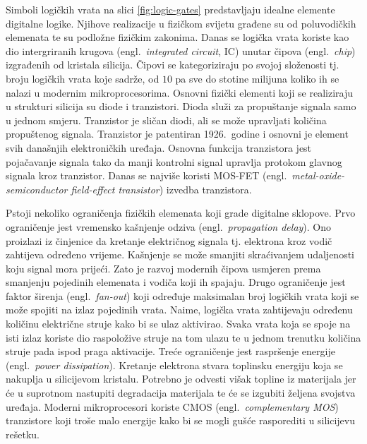 \documentclass[times, utf8, diplomski]{fer}
\begin{document}
Simboli logičkih vrata na slici \ref{fig:logic-gates} predstavljaju idealne elemente digitalne logike. Njihove realizacije u fizičkom svijetu građene su od poluvodičkih elemenata te su podložne fizičkim zakonima. Danas se logička vrata koriste kao dio intergriranih krugova (engl.~\textit{integrated circuit}, IC) unutar čipova (engl.~\textit{chip}) izgrađenih od kristala silicija. Čipovi se kategoriziraju po svojoj složenosti tj. broju logičkih vrata koje sadrže, od $10$ pa sve do stotine milijuna koliko ih se nalazi u modernim mikroprocesorima. Osnovni fizički elementi koji se realiziraju u strukturi silicija su diode i tranzistori. Dioda služi za propuštanje signala samo u jednom smjeru. Tranzistor je sličan diodi, ali se može upravljati količina propuštenog signala. Tranzistor je patentiran 1926.~godine i osnovni je element svih današnjih elektroničkih uređaja. Osnovna funkcija tranzistora jest pojačavanje signala tako da manji kontrolni signal upravlja protokom glavnog signala kroz tranzistor. Danas se najviše koristi MOS-FET (engl.~\textit{metal-oxide-semiconductor field-effect transistor}) izvedba tranzistora.

Pstoji nekoliko ograničenja fizičkih elemenata koji grade digitalne sklopove. Prvo ograničenje jest vremensko kašnjenje odziva (engl.~\textit{propagation delay}). Ono proizlazi iz činjenice da kretanje električnog signala tj. elektrona kroz vodič zahtijeva određeno vrijeme. Kašnjenje se može smanjiti skraćivanjem udaljenosti koju signal mora prijeći. Zato je razvoj modernih čipova usmjeren prema smanjenju pojedinih elemenata i vodiča koji ih spajaju. Drugo ograničenje jest faktor širenja (engl.~\textit{fan-out}) koji određuje maksimalan broj logičkih vrata koji se može spojiti na izlaz pojedinih vrata. Naime, logička vrata zahtijevaju određenu količinu električne struje kako bi se ulaz aktivirao. Svaka vrata koja se spoje na isti izlaz koriste dio raspoložive struje na tom ulazu te u jednom trenutku količina struje pada ispod praga aktivacije. Treće ograničenje jest raspršenje energije (engl.~\textit{power dissipation}). Kretanje elektrona stvara toplinsku energiju koja se nakuplja u silicijevom kristalu. Potrebno je odvesti višak topline iz materijala jer će u suprotnom nastupiti degradacija materijala te će se izgubiti željena svojstva uređaja. Moderni mikroprocesori koriste CMOS (engl.~\textit{complementary MOS}) tranzistore koji troše malo energije kako bi se mogli gušće rasporediti u silicijevu rešetku.
\end{document}
